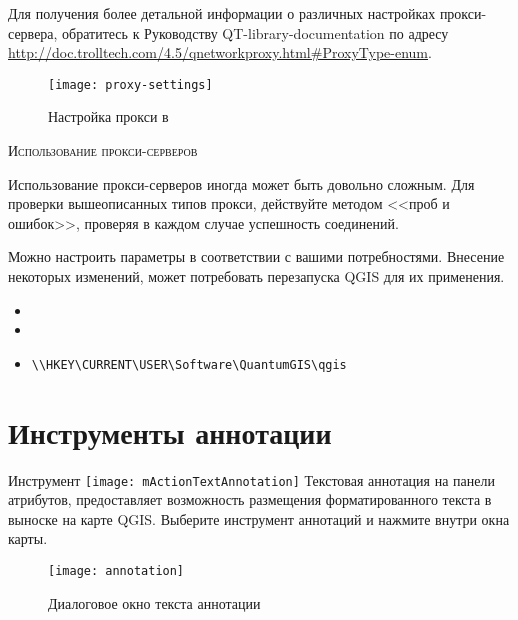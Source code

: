 Для получения более детальной информации о различных настройках прокси-сервера,
обратитесь к Руководству QT-library-documentation по адресу \\
\url{http://doc.trolltech.com/4.5/qnetworkproxy.html#ProxyType-enum}.

\begin{figure}[ht]
   \centering
   \texttt{[image: proxy-settings]}
   \caption{Настройка прокси в \qg \nixcaption}
   \label{fig:proxy-settings}
\end{figure}

\begin{Tip} \caption{\textsc{Использование прокси-серверов}}
Использование прокси-серверов иногда может быть довольно сложным. Для
проверки вышеописанных типов прокси, действуйте методом <<проб и ошибок>>,
проверяя в каждом случае успешность соединений.
\end{Tip}

Можно настроить параметры в соответствии с вашими потребностями. Внесение
некоторых изменений, может потребовать перезапуска QGIS для их применения.

\begin{itemize}
\item {}
\item {}
\item {}
\begin{verbatim}
\\HKEY\CURRENT\USER\Software\QuantumGIS\qgis
\end{verbatim}
\end{itemize}

\section{Инструменты аннотации}\label{sec:annotations}

Инструмент \texttt{[image: mActionTextAnnotation]}
Текстовая аннотация на панели атрибутов, предоставляет возможность размещения
форматированного текста в выноске на карте QGIS. Выберите инструмент аннотаций
и нажмите внутри окна карты.

\begin{figure}[ht]
   \centering
   \texttt{[image: annotation]}
   \caption{Диалоговое окно текста аннотации \nixcaption}
   \label{fig:annotation}
\end{figure}


